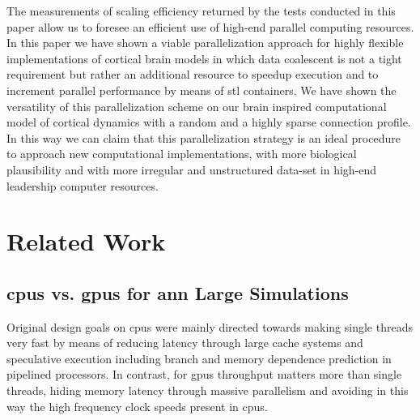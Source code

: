 \documentclass[10pt,journal,compsoc]{IEEEtran}
\begin{document}
\begin{itemize}
\begin{itemize}
	\end{itemize}

\end{itemize}

The measurements of scaling efficiency returned by the tests conducted in this paper allow us to foresee an efficient use of high-end parallel computing resources. In this paper we have shown a viable parallelization approach for highly flexible implementations of cortical brain models in which data coalescent is not a tight requirement but rather an additional resource to speedup execution and to increment parallel performance by means of \gls{stl} containers. We have shown the versatility of this parallelization scheme on our brain inspired computational model of cortical dynamics with a random and a highly sparse connection profile. In this way we can claim that this parallelization strategy is an ideal procedure to approach new computational implementations, with more biological plausibility and with more irregular and unstructured data-set in high-end leadership computer resources.


















\section{Related Work}





\subsection{\glspl{cpu} vs. \glspl{gpu} for \gls{ann} Large Simulations}

Original design goals on \glspl{cpu} were mainly directed towards making single threads very fast by means of reducing latency through large cache systems and speculative execution including branch and memory dependence prediction in pipelined processors. In contrast, for \glspl{gpu} throughput matters more than single threads, hiding memory latency through massive parallelism and avoiding in this way the high frequency clock speeds present in \glspl{cpu}.
\end{document}
